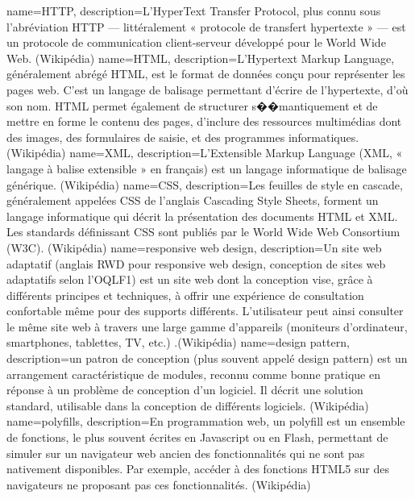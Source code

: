 {
  name=HTTP,
  description={L'HyperText Transfer Protocol, plus connu sous l'abréviation HTTP — littéralement « protocole de transfert hypertexte » — est un protocole de communication client-serveur développé pour le World Wide Web. (Wikipédia)}
}
{
  name=HTML,
  description={L’Hypertext Markup Language, généralement abrégé HTML, est le format de données conçu pour représenter les pages web. C’est un langage de balisage permettant d’écrire de l’hypertexte, d’où son nom. HTML permet également de structurer s��mantiquement et de mettre en forme le contenu des pages, d’inclure des ressources multimédias dont des images, des formulaires de saisie, et des programmes informatiques. (Wikipédia)}
}
{
  name=XML,
  description={L'Extensible Markup Language (XML, « langage à balise extensible » en français) est un langage informatique de balisage générique. (Wikipédia)}
}
{
  name=CSS,
  description={Les feuilles de style en cascade, généralement appelées CSS de l'anglais Cascading Style Sheets, forment un langage informatique qui décrit la présentation des documents HTML et XML. Les standards définissant CSS sont publiés par le World Wide Web Consortium (W3C). (Wikipédia)}
}
{
  name=responsive web design,
  description={Un site web adaptatif (anglais RWD pour responsive web design, conception de sites web adaptatifs selon l'OQLF1) est un site web dont la conception vise, grâce à différents principes et techniques, à offrir une expérience de consultation confortable même pour des supports différents. L'utilisateur peut ainsi consulter le même site web à travers une large gamme d'appareils (moniteurs d'ordinateur, smartphones, tablettes, TV, etc.) .(Wikipédia)}
}
{
  name=design pattern,
  description={un patron de conception (plus souvent appelé design pattern) est un arrangement caractéristique de modules, reconnu comme bonne pratique en réponse à un problème de conception d'un logiciel. Il décrit une solution standard, utilisable dans la conception de différents logiciels. (Wikipédia)}
}
{
  name=polyfills,
  description={En programmation web, un polyfill est un ensemble de fonctions, le plus souvent écrites en Javascript ou en Flash, permettant de simuler sur un navigateur web ancien des fonctionnalités qui ne sont pas nativement disponibles. Par exemple, accéder à des fonctions HTML5 sur des navigateurs ne proposant pas ces fonctionnalités. (Wikipédia)}
}



